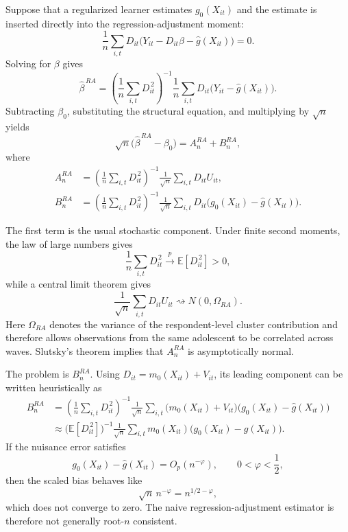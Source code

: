 \documentclass[11pt,oneside,a4paper]{book}
\begin{document}
Suppose that a regularized learner estimates \(g_0(X_{it})\) and the estimate is inserted directly into the regression-adjustment moment:
\begin{equation*}
\frac{1}{n}\sum_{i,t}
D_{it}\bigl(Y_{it}-D_{it}\beta-\widehat{g}(X_{it})\bigr)
=0.
\end{equation*}
Solving for \(\beta\) gives
\begin{equation*}
\widehat{\beta}^{\,RA}
=
\left(
\frac{1}{n}\sum_{i,t}D_{it}^{\,2}
\right)^{-1}
\frac{1}{n}\sum_{i,t}
D_{it}\bigl(Y_{it}-\widehat{g}(X_{it})\bigr).
\end{equation*}
Subtracting \(\beta_0\), substituting the structural equation, and multiplying by \(\sqrt{n}\) yields
\begin{equation*}
\sqrt{n}\bigl(\widehat{\beta}^{\,RA}-\beta_0\bigr)
=
A_n^{RA}+B_n^{RA},
\end{equation*}
where
\begin{align*}
A_n^{RA}
&=
\left(
\frac{1}{n}\sum_{i,t}D_{it}^{\,2}
\right)^{-1}
\frac{1}{\sqrt{n}}\sum_{i,t}D_{it}U_{it}, \\
B_n^{RA}
&=
\left(
\frac{1}{n}\sum_{i,t}D_{it}^{\,2}
\right)^{-1}
\frac{1}{\sqrt{n}}\sum_{i,t}
D_{it}\bigl(g_0(X_{it})-\widehat{g}(X_{it})\bigr).
\end{align*}

The first term is the usual stochastic component. Under finite second moments, the law of large numbers gives
\begin{equation*}
\frac{1}{n}\sum_{i,t}D_{it}^{\,2}
\overset{p}{\longrightarrow}
\mathbb{E}[D_{it}^{\,2}]>0,
\end{equation*}
while a central limit theorem gives
\begin{equation*}
\frac{1}{\sqrt{n}}\sum_{i,t}D_{it}U_{it}
\rightsquigarrow
N(0,\Omega_{RA}).
\end{equation*}
Here \(\Omega_{RA}\) denotes the variance of the respondent-level cluster contribution and therefore allows observations from the same adolescent to be correlated across waves. Slutsky's theorem implies that \(A_n^{RA}\) is asymptotically normal.

The problem is \(B_n^{RA}\). Using \(D_{it}=m_0(X_{it})+V_{it}\), its leading component can be written heuristically as
\begin{align*}
B_n^{RA}
&=
\left(
\frac{1}{n}\sum_{i,t}D_{it}^{\,2}
\right)^{-1}
\frac{1}{\sqrt{n}}\sum_{i,t}
\bigl(m_0(X_{it})+V_{it}\bigr)
\bigl(g_0(X_{it})-\widehat{g}(X_{it})\bigr) \\
&\approx
\bigl(\mathbb{E}[D_{it}^{\,2}]\bigr)^{-1}
\frac{1}{\sqrt{n}}\sum_{i,t}
m_0(X_{it})
\bigl(g_0(X_{it})-\widehat{g}(X_{it})\bigr).
\end{align*}
If the nuisance error satisfies
\begin{equation*}
g_0(X_{it})-\widehat{g}(X_{it})
=
O_p(n^{-\varphi}),
\qquad
0<\varphi<\frac{1}{2},
\end{equation*}
then the scaled bias behaves like
\begin{equation*}
\sqrt{n}\,n^{-\varphi}
=
n^{1/2-\varphi},
\end{equation*}
which does not converge to zero. The naive regression-adjustment estimator is therefore not generally root-\(n\) consistent.
\end{document}
